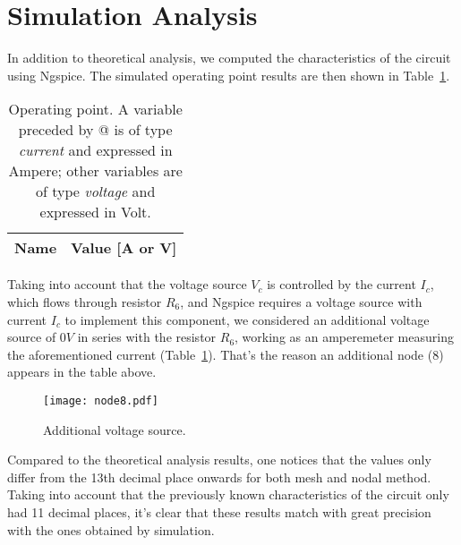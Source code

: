\section{Simulation Analysis}
\label{sec:simulation}

In addition to theoretical analysis, we computed the characteristics of the circuit using Ngspice. The simulated operating point results are then shown in Table~\ref{tab:op}.

\vspace{1mm}

\begin{table}[H]
  \centering
  \begin{tabular}{|l|r|}
    \hline    
    {\bf Name} & {\bf Value [A or V]} \\ \hline
    
  \end{tabular}
  \caption{Operating point. A variable preceded by @ is of type {\em current}
    and expressed in Ampere; other variables are of type {\it voltage} and expressed in
    Volt.}
  \label{tab:op}
\end{table}

Taking into account that the voltage source $V_c$ is controlled by the current $I_c$, which flows through resistor $R_6$, and Ngspice requires a voltage source with current $I_c$ to implement this component, we considered an additional voltage source of $0V$ in series with the resistor $R_6$, working as an amperemeter measuring the aforementioned current (Table~\ref{fig:node8}). That's the reason an additional node (8) appears in the table above.

\begin{figure}[H] \centering
\texttt{[image: node8.pdf]}
\caption{Additional voltage source.}
\label{fig:node8}
\end{figure}

Compared to the theoretical analysis results, one notices that the values only differ from the 13th decimal place onwards for both mesh and nodal method. Taking into account that the previously known characteristics of the circuit only had 11 decimal places, it's clear that these results match with great precision with the ones obtained by simulation.
